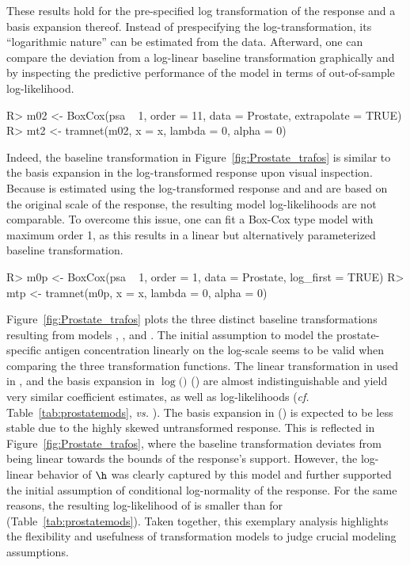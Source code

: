 These results hold for the pre-specified log transformation of the response and
a basis expansion thereof. Instead of prespecifying the log-transformation, its
``logarithmic nature'' can be estimated from the data. Afterward, one can compare the
deviation from a log-linear baseline transformation graphically and by inspecting
the predictive performance of the model in terms of out-of-sample log-likelihood.
\begin{example}
R> m02 <- BoxCox(psa ~ 1, order = 11, data = Prostate, extrapolate = TRUE)
R> mt2 <- tramnet(m02, x = x, lambda = 0, alpha = 0)
\end{example}
Indeed, the baseline transformation in Figure~\ref{fig:Prostate_trafos} is
similar to the basis expansion in the log-transformed response upon visual inspection.
Because  is estimated using the log-transformed response and 
and  are based on the original scale of the response, the resulting
model log-likelihoods are not comparable. To overcome this issue, one can fit a
Box-Cox type model with maximum order 1, as this results in a linear but
alternatively parameterized baseline transformation.
\begin{example}
R> m0p <- BoxCox(psa ~ 1, order = 1, data = Prostate, log_first = TRUE)
R> mtp <- tramnet(m0p, x = x, lambda = 0, alpha = 0)
\end{example}
Figure~\ref{fig:Prostate_trafos} plots the three distinct baseline transformations
resulting from models , , and . The initial assumption
to model the prostate-specific antigen concentration linearly on the log-scale
seems to be valid when comparing the three transformation functions.
The linear transformation in  used in , and the basis expansion
in $\log($$)$ () are almost indistinguishable and yield very
similar coefficient estimates, as well as log-likelihoods (\emph{cf.} 
Table~\ref{tab:prostatemods},  \emph{vs.} ). The basis expansion
in  () is expected to be less stable due to the highly skewed
untransformed response. This is reflected in Figure~\ref{fig:Prostate_trafos},
where the baseline transformation deviates from being linear towards the bounds
of the response's support. However, the log-linear behavior of $\h$ was clearly
captured by this model and further supported the initial assumption of conditional
log-normality of the response. For the same reasons, the resulting log-likelihood
of  is smaller than for  (Table~\ref{tab:prostatemods}). Taken together,
this exemplary analysis highlights the flexibility and usefulness of transformation
models to judge crucial modeling assumptions.

